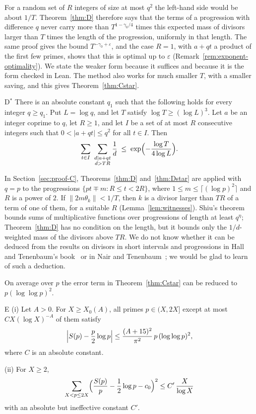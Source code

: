 For a random set of $R$ integers of size at most $q^2$ the left-hand side would be about $1/T$. Theorem~\ref{thm:D} therefore says that the terms of a progression with difference $q$ never carry more than $T^{1-\gamma_0/4}$ times this expected mass of divisors larger than $T$ times the length of the progression, uniformly in that length. The same proof gives the bound $T^{-\gamma_0+\varepsilon}$, and the case $R=1$, with $a+qt$ a product of the first few primes, shows that this is optimal up to $\varepsilon$ (Remark~\ref{rem:exponent-optimality}). We state the weaker form because it suffices and because it is the form checked in Lean. The method also works for much smaller $T$, with a smaller saving, and this gives Theorem~\ref{thm:Cstar}.

\begin{namedthm}{D$^*$}\label{thm:Dstar}
There is an absolute constant $q_1$ such that the following holds for every integer $q\ge q_1$. Put $L=\log q$, and let $T$ satisfy $\log T\ge(\log L)^3$. Let $a$ be an integer coprime to $q$, let $R\ge1$, and let $I$ be a set of at most $R$ consecutive integers such that $0<|a+qt|\le q^2$ for all $t\in I$. Then
\[
\sum_{t\in I}\ \sum_{\substack{d\mid a+qt\\ d>TR}}\frac1d\;\le\;\exp\Bigl(-\frac{\log T}{4\log L}\Bigr).
\]
\end{namedthm}

In Section~\ref{sec:proof-C}, Theorems~\ref{thm:D} and~\ref{thm:Dstar} are applied with $q=p$ to the progressions $\{pt\mp m:R\le t<2R\}$, where $1\le m\le\lceil(\log p)^2\rceil$ and $R$ is a power of $2$. If $\|2m\theta_k\|<1/T$, then $k$ is a divisor larger than $TR$ of a term of one of them, for a suitable $R$ (Lemma~\ref{lem:witnesses}). Shiu's theorem~\cite{b24} bounds sums of multiplicative functions over progressions of length at least $q^\eta$; Theorem~\ref{thm:D} has no condition on the length, but it bounds only the $1/d$-weighted mass of the divisors above $TR$. We do not know whether it can be deduced from the results on divisors in short intervals and progressions in Hall and Tenenbaum's book~\cite{b37} or in Nair and Tenenbaum~\cite{b38}; we would be glad to learn of such a deduction.

On average over $p$ the error term in Theorem~\ref{thm:Cstar} can be reduced to $p(\log\log p)^2$.

\begin{namedthm}{E}\label{thm:E}
\textup{(i)} Let $A>0$. For $X\ge X_0(A)$, all primes $p\in(X,2X]$ except at most $CX(\log X)^{-A}$ of them satisfy
\[
\Bigl|S(p)-\frac p2\log p\Bigr|\le\frac{(A+15)^2}{\pi^2}\,p\,(\log\log p)^2,
\]
where $C$ is an absolute constant.

\textup{(ii)} For $X\ge2$,
\[
\sum_{X<p\le2X}\Bigl(\frac{S(p)}p-\frac12\log p-c_0\Bigr)^2\le C'\,\frac X{\log X}
\]
with an absolute but ineffective constant $C'$.
\end{namedthm}

